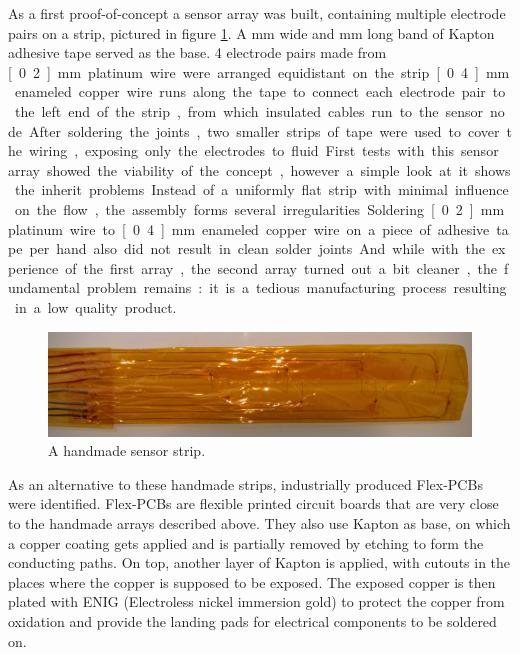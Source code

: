 As a first proof-of-concept a sensor array was built, containing multiple electrode pairs on a strip, pictured in figure \ref{fig:v2}. A \unit[50]{mm} wide and \unit[250]{mm} long band of Kapton adhesive tape served as the base. 4 electrode pairs made from \unit[0.2]{mm} platinum wire were arranged equidistant on the strip. \unit[0.4]{mm} enameled copper wire runs along the tape to connect each electrode pair to the left end of the strip, from which insulated cables run to the sensor node. After soldering the joints, two smaller strips of tape were used to cover the wiring, exposing only the electrodes to fluid.

First tests with this sensor array showed the viability of the concept, however a simple look at it shows the inherit problems. Instead of a uniformly flat strip with minimal influence on the flow, the assembly forms several irregularities. Soldering \unit[0.2]{mm} platinum wire to \unit[0.4]{mm} enameled copper wire on a piece of adhesive tape per hand also did not result in clean solder joints. And while with the experience of the first array, the second array turned out a bit cleaner, the fundamental problem remains: it is a tedious manufacturing process resulting in a low quality product.

\begin{figure}
	\begin{center}
		\includegraphics[width=\textwidth]{images/v2.jpg} 
		\caption{A handmade sensor strip.}
		\label{fig:v2}
	\end{center}
\end{figure}

As an alternative to these handmade strips, industrially produced Flex-PCBs were identified. Flex-PCBs are flexible printed circuit boards that are very close to the handmade arrays described above. They also use Kapton as base, on which a copper coating gets applied and is partially removed by etching to form the conducting paths. On top, another layer of Kapton is applied, with cutouts in the places where the copper is supposed to be exposed. The exposed copper is then plated with ENIG (Electroless nickel immersion gold) to protect the copper from oxidation and provide the landing pads for electrical components to be soldered on.


